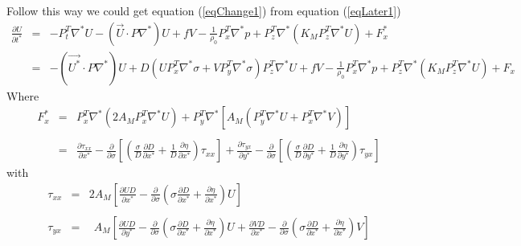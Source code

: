 \documentclass[oribibl]{llncs}
\begin{document}
Follow this way we could get equation (\ref{eqChange1}) from equation (\ref{eqLater1})
\begin{eqnarray}
\frac{\partial U}{\partial t^*} &=&-P^T_t\nabla^* U -(\vec{U} \cdot P \nabla^*)U+fV - \frac{1}{\rho_0} P^T_x\nabla^*p + P^T_z\nabla^*\left ( K_M P^T_z\nabla^*U\right) + F^*_x   \label{eqChange1} \\
&=&  -(\vec{U^*} \cdot P \nabla^*)U + D(UP^T_x \nabla^* \sigma + VP^T_y \nabla^* \sigma)P^T_z \nabla^* U + fV - \frac{1}{\rho_0} P^T_x\nabla^* p + P^T_z\nabla^* \left ( K_M P^T_z\nabla^* U\right)+F_x
\end{eqnarray}
Where 
\begin{eqnarray}
F^*_x&=&P^T_x \nabla^* \left(2A_M P^T_x \nabla^* {U} \right) + P^T_y \nabla^* \left[A_M \left(P^T_y \nabla^* {U} + P^T_x \nabla^* {V}\right) \right]  \\ \nonumber \\
     &=& \frac{\partial \tau_{xx}}{\partial x^*} -\frac{\partial}{\partial \sigma} \left[ \left(  \frac{\sigma}{D} \frac{\partial D}{\partial x^*} + \frac{1}{D} \frac{\partial \eta}{\partial x^*} \right) \tau_{xx}  \right] +  \frac{\partial \tau_{yx}}{\partial y^*} -\frac{\partial}{\partial \sigma} \left[ \left(  \frac{\sigma}{D} \frac{\partial D}{\partial y^*} + \frac{1}{D} \frac{\partial \eta}{\partial y^*} \right) \tau_{yx}  \right]   \nonumber 
\end{eqnarray}
with
\begin{eqnarray}
\tau_{xx} &=& 2 A_M \left[ \frac{\partial UD}{\partial x^*} -\frac{\partial}{\partial \sigma} \left( \sigma \frac{\partial D}{\partial x^*} + \frac{\partial \eta}{\partial x^*} \right)U \right] \\
\nonumber \\
\tau_{yx} &=& \ \ A_M  \left[ \frac{\partial UD}{\partial y^*} -\frac{\partial}{\partial \sigma} \left( \sigma \frac{\partial D}{\partial x^*} + \frac{\partial \eta}{\partial x^*} \right)U +  \frac{\partial VD}{\partial x^*} -\frac{\partial}{\partial \sigma} \left( \sigma \frac{\partial D}{\partial x^*} + \frac{\partial \eta}{\partial x^*} \right)V \right]
\end{eqnarray}
\end{document}
